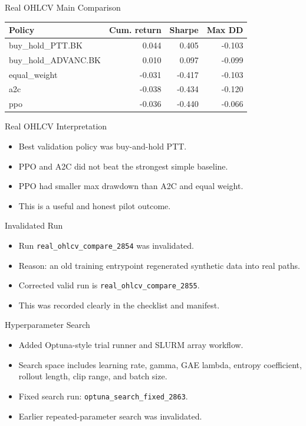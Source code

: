 \documentclass[aspectratio=43,10pt]{beamer}
\begin{document}
\begin{frame}{Real OHLCV Main Comparison}
\begin{center}
\begin{tabular}{lrrr}
\toprule
Policy & Cum. return & Sharpe & Max DD \\
\midrule
buy\_hold\_PTT.BK & 0.044 & 0.405 & -0.103 \\
buy\_hold\_ADVANC.BK & 0.010 & 0.097 & -0.099 \\
equal\_weight & -0.031 & -0.417 & -0.103 \\
a2c & -0.038 & -0.434 & -0.120 \\
ppo & -0.036 & -0.440 & -0.066 \\
\bottomrule
\end{tabular}
\end{center}
\end{frame}

\begin{frame}{Real OHLCV Interpretation}
\begin{itemize}
  \item Best validation policy was buy-and-hold PTT.
  \item PPO and A2C did not beat the strongest simple baseline.
  \item PPO had smaller max drawdown than A2C and equal weight.
  \item This is a useful and honest pilot outcome.
\end{itemize}
\end{frame}

\begin{frame}{Invalidated Run}
\begin{itemize}
  \item Run \texttt{real\_ohlcv\_compare\_2854} was invalidated.
  \item Reason: an old training entrypoint regenerated synthetic data into real paths.
  \item Corrected valid run is \texttt{real\_ohlcv\_compare\_2855}.
  \item This was recorded clearly in the checklist and manifest.
\end{itemize}
\end{frame}

\begin{frame}{Hyperparameter Search}
\begin{itemize}
  \item Added Optuna-style trial runner and SLURM array workflow.
  \item Search space includes learning rate, gamma, GAE lambda, entropy coefficient, rollout length, clip range, and batch size.
  \item Fixed search run: \texttt{optuna\_search\_fixed\_2863}.
  \item Earlier repeated-parameter search was invalidated.
\end{itemize}
\end{frame}
\end{document}
